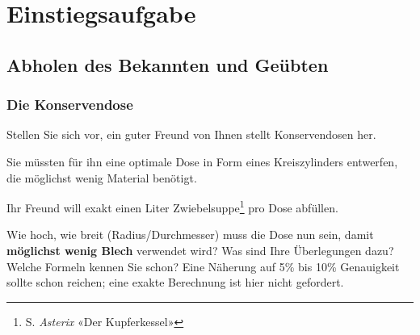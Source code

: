 
\section*{Einstiegsaufgabe}

\subsection*{Abholen des Bekannten und Geübten}


\subsubsection*{Die Konservendose}
Stellen Sie sich vor, ein guter Freund von Ihnen stellt Konservendosen her.

Sie müssten für ihn eine optimale Dose in Form eines Kreiszylinders entwerfen, die möglichst wenig
Material benötigt.

\begin{center}
\end{center}

Ihr Freund will exakt einen Liter
Zwiebelsuppe\footnote{S. \textit{Asterix} «Der Kupferkessel»} pro Dose abfüllen.

Wie hoch, wie breit (Radius/Durchmesser) muss die Dose nun sein,
damit \textbf{möglichst wenig Blech} verwendet wird? Was sind Ihre
Überlegungen dazu? Welche Formeln kennen Sie schon? Eine Näherung auf
5\% bis 10\% Genauigkeit sollte schon reichen; eine exakte Berechnung ist hier nicht gefordert.



